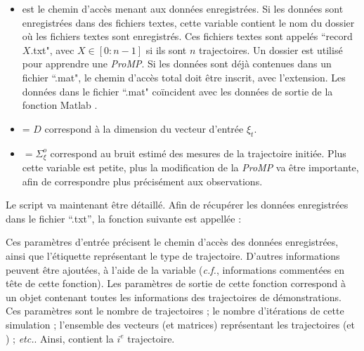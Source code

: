 \documentclass[utf8]{frontiersSCNS} %
\newcommand{\rev}[1]{\textcolor{blue}{#1}}
\begin{document}
\begin{itemize}
\item {} est le chemin d'accès menant aux données enregistrées. Si les données sont enregistrées dans des fichiers textes, cette variable contient le nom du dossier où les fichiers textes sont enregistrés. Ces fichiers textes sont appelés ``record$X$.txt", avec $X \in [0:n-1]$ si ils sont $n$ trajectoires. Un dossier est utilisé pour apprendre une \textit{ProMP}. Si les données sont déjà contenues dans un fichier ``.mat", le chemin d'accès total doit être inscrit, avec l'extension. Les données dans le fichier ``.mat" coïncident avec les données de sortie de la fonction Matlab . %
\item {}= $D$ correspond à la dimension du vecteur d'entrée $\xi_t$. 
\item {} $= \Sigma^o_\xi$ correspond au bruit estimé des mesures de la trajectoire initiée. Plus cette variable est petite, plus la modification de la \textit{ProMP} va être importante, afin de correspondre plus précisément aux observations.
\end{itemize}

Le script va maintenant être détaillé. Afin de récupérer les données enregistrées dans le fichier ``.txt'', la fonction suivante est appellée :


Ces paramètres d'entrée précisent le chemin d'accès des données enregistrées, ainsi que l'étiquette représentant le type de trajectoire. D'autres informations peuvent être ajoutées, à l'aide de la variable  (\textit{c.f.}, informations commentées en tête de cette fonction). 
Les paramètres de sortie de cette fonction correspond à un objet contenant toutes les informations des trajectoires de démonstrations. Ces paramètres sont le nombre de trajectoires  ; le nombre d'itérations de cette simulation  ; l'ensemble des vecteurs (et matrices) représentant les trajectoires  (et ) ; \textit{etc.}. 
Ainsi,  contient la $i^e$ trajectoire.
\end{document}
